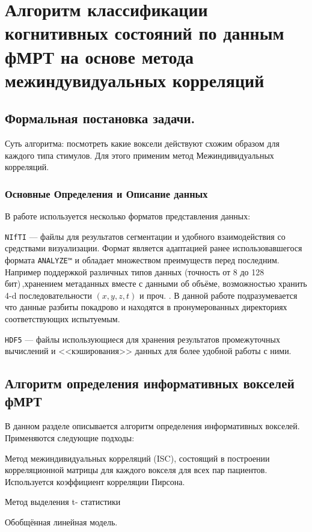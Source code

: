  \chapter{Алгоритм классификации когнитивных состояний по данным фМРТ на основе метода межиндувидуальных корреляций}


\section{Формальная постановка задачи.}
\begin{annotation}
	Суть алгоритма: посмотреть какие воксели действуют схожим образом для каждого типа стимулов. Для этого применим метод Межиндивидуальных корреляций.
\end{annotation}

\subsection*{Основные Определения и Описание данных}

В работе используется несколько форматов представления данных:
\begin{compactitem}
	\item \texttt{NIfTI} --- файлы для результатов сегментации и удобного взаимодействия со средствами визуализации. Формат является адаптацией ранее использовавшегося формата \texttt{ANALYZE™} и обладает множеством преимуществ перед последним. Например поддержкой различных типов данных (точность от 8 до 128 бит)\,,хранением метаданных вместе с данными об объёме, возможностью хранить 4-d последовательности $(x,y,z,t)$  и проч. \cite{cox2004sort}. В данной работе подразумевается что данные разбиты покадрово и находятся в пронумерованных директориях соответствующих испытуемым.
	\item \texttt{HDF5} --- файлы использующиеся для хранения результатов промежуточных вычислений и <<кэширования>> данных для более удобной работы с ними.
\end{compactitem}

\section{Алгоритм определения информативных вокселей фМРТ}
\begin{annotation}
В данном разделе описывается алгоритм определения информативных вокселей. Применяются следующие подходы:
\begin{compactitem}
	\item Метод межиндивидуальных корреляций (ISC), состоящий в построении корреляционной матрицы для каждого вокселя для всех пар пациентов. Используется коэффициент корреляции Пирсона.
	\item Метод выделения t- статистики
	\item Обобщённая линейная модель.
\end{compactitem}
\end{annotation}

